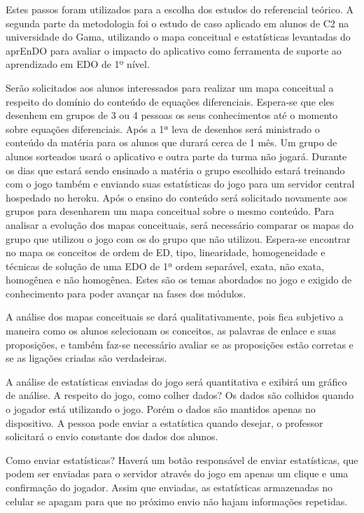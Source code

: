 Estes passos foram utilizados para a escolha dos estudos do referencial teórico.
A segunda parte da metodologia foi o estudo de caso aplicado em alunos de C2 na universidade do Gama, utilizando o mapa conceitual e estatísticas levantadas do aprEnDO para avaliar o impacto do aplicativo como ferramenta de suporte ao aprendizado em EDO de 1º nível.

Serão solicitados aos alunos interessados para realizar um mapa conceitual a respeito do domínio do conteúdo de equações diferenciais. Espera-se que eles desenhem em grupos de 3 ou 4 pessoas os seus conhecimentos até o momento sobre equações diferenciais. Após a 1ª leva de desenhos será ministrado o conteúdo da matéria para os alunos que durará cerca de 1 mês. Um grupo de alunos sorteados usará o aplicativo e outra parte da turma não jogará. Durante os dias que estará sendo ensinado a matéria o grupo escolhido estará treinando com o jogo também e enviando suas estatísticas do jogo para um servidor central hospedado no heroku. Após o ensino do conteúdo será solicitado novamente aos grupos para desenharem um mapa conceitual sobre o mesmo conteúdo. Para analisar a evolução dos mapas conceituais, será necessário comparar os mapas do grupo que utilizou o jogo com os do grupo que não utilizou.
Espera-se encontrar no mapa os conceitos de ordem de ED, tipo, linearidade, homogeneidade e técnicas de solução de uma EDO de 1ª ordem separável, exata, não exata, homogênea e não homogênea. Estes são os temas abordados no jogo e exigido de conhecimento para poder avançar na fases dos módulos.

A análise dos mapas conceituais se dará qualitativamente, pois fica subjetivo a maneira como os alunos selecionam os conceitos, as palavras de enlace e suas proposições, e também faz-se necessário avaliar se as proposições estão corretas e se as ligações criadas são verdadeiras.

A análise de estatísticas enviadas do jogo será quantitativa e exibirá um gráfico de análise. A respeito do jogo, como colher dados? Os dados são colhidos quando o jogador está utilizando o jogo. Porém o dados são mantidos apenas no dispositivo. A pessoa pode enviar a estatística quando desejar, o professor solicitará o envio constante dos dados dos alunos.

Como enviar estatísticas? Haverá um botão responsável de enviar estatísticas, que podem ser enviadas para o servidor através do jogo em apenas um clique e uma confirmação do jogador. Assim que enviadas, as estatísticas armazenadas no celular se apagam para que no próximo envio não hajam informações repetidas.

